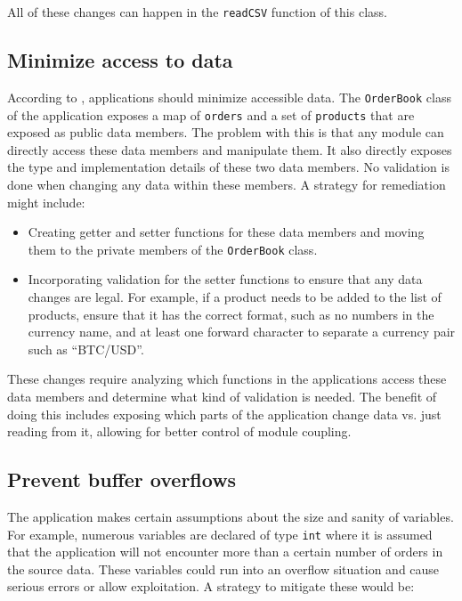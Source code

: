 All of these changes can happen in the \texttt{readCSV} function of this class.


\subsection{Minimize access to data} %
\label{sub:minimize_access_to_data}
According to \cite{wheeler_2015}, applications should minimize accessible data. The \texttt{OrderBook} class of the application exposes a map of \texttt{orders} and a set of \texttt{products} that are exposed as public data members. The problem with this is that any module can directly access these data members and manipulate them. It also directly exposes the type and implementation details of these two data members. No validation is done when changing any data within these members. A strategy for remediation might include:

\begin{itemize}
	\item Creating getter and setter functions for these data members and moving them to the private members of the \texttt{OrderBook} class.
	\item Incorporating validation for the setter functions to ensure that any data changes are legal. For example, if a product needs to be added to the list of products, ensure that it has the correct format, such as no numbers in the currency name, and at least one forward character to separate a currency pair such as ``BTC/USD''.
\end{itemize}

These changes require analyzing which functions in the applications access these data members and determine what kind of validation is needed. The benefit of doing this includes exposing which parts of the application change data vs. just reading from it, allowing for better control of module coupling.

\subsection{Prevent buffer overflows} %
\label{sub:prevent_buffer_overflows}
The application makes certain assumptions about the size and sanity of variables. For example, numerous variables are declared of type \texttt{int} where it is assumed that the application will not encounter more than a certain number of orders in the source data. These variables could run into an overflow situation and cause serious errors or allow exploitation. A strategy to mitigate these would be:

